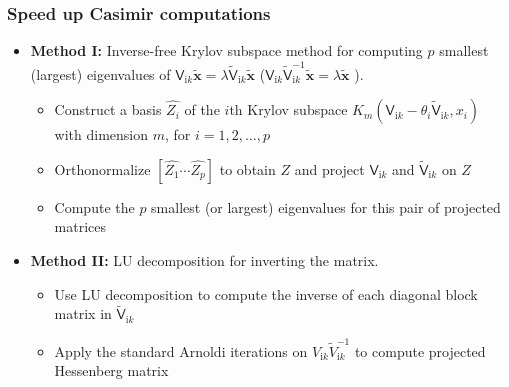 \documentclass[dvipsnames,10pt]{beamer}
\begin{document}
\begin{frame}
    \frametitle{Speed up Casimir computations}
    \vspace{0.3cm}
    
    \begin{itemize}
        \item \textbf{Method I:} Inverse-free Krylov subspace method for computing $p$ smallest (largest) eigenvalues of  $\mathsf{V}_{\mathrm{i}k}\tilde{\boldsymbol{x}} = \lambda \tilde{\mathsf{V}}_{\mathrm{i}k}\tilde{\boldsymbol{x}}$ ($
        \mathsf{V}_{\mathrm{i}k}\tilde{\mathsf{V}}_{\mathrm{i}k}^{-1}\tilde{\boldsymbol{x}} = \lambda \tilde{\boldsymbol{x}}$ ).
                \vspace{0.3cm}

        \begin{itemize}
            \item Construct a basis $\hat{Z_{i}}$ of the $i$th Krylov subspace $K_{m}(\mathsf{V}_{\mathrm{i}k} - \theta_{i}\tilde{\mathsf{V}}_{\mathrm{i}k}, x_{i})$ with dimension $m$, for $i = 1, 2, \dots, p$
                    \vspace{0.1cm}
            \item Orthonormalize $\left[\hat{Z_{1}} \cdots \hat{Z_{p}}\right]$ to obtain $Z$ and project $\mathsf{V}_{\mathrm{i}k}$ and $\tilde{\mathsf{V}}_{\mathrm{i}k}$ on $Z$
                    \vspace{0.1cm}
            \item Compute the  $p$ smallest (or largest) eigenvalues for this pair of projected matrices
        \end{itemize}
                \vspace{0.3cm}

        \item \textbf{Method II:} LU decomposition for inverting the matrix.
        \vspace{0.3cm}
        \begin{itemize}
            \item Use LU decomposition to compute the inverse of each diagonal block matrix in $\tilde{\mathsf{V}}_{\mathrm{i}k}$                 \vspace{0.3cm}
            \item Apply the standard Arnoldi iterations on $V_{\mathrm{i}k}\tilde{V}_{\mathrm{i}k}^{-1}$  to compute projected Hessenberg matrix
        \end{itemize}
    \end{itemize}

\end{frame}
\end{document}
